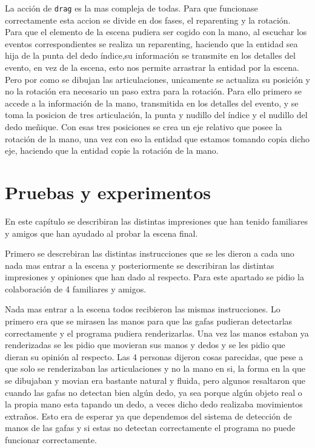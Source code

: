 \documentclass[a4paper, 12pt]{book}
\begin{document}
La acción de \texttt{drag} es la mas compleja de todas. Para que funcionase correctamente esta accion se divide en dos fases, el reparenting y la rotación. Para que el elemento de la escena pudiera ser cogido con la mano, al escuchar los eventos correspondientes se realiza un reparenting, haciendo que la entidad sea hija de la punta del dedo índice,su información se transmite en los detalles del evento, en vez de la escena, esto nos permite arrastrar la entidad por la escena. Pero por como se dibujan las articulaciones, unicamente se actualiza su posición y no la rotación era necesario un paso extra para la rotación.
Para ello primero se accede a la información de la mano, transmitida en los detalles del evento, y se toma la posicion de tres articulación, la punta y nudillo del índice y el nudillo del dedo meñique. Con esas tres posiciones se crea un eje relativo que posee la rotación de la mano, una vez con eso la entidad que estamos tomando copia dicho eje, haciendo que la entidad copie la rotación de la mano.

\cleardoublepage
\chapter{Pruebas y experimentos}
\label{chap:pruebas-experimentos}
En este capítulo se describiran las distintas impresiones que han tenido familiares y amigos que han ayudado al probar la escena final. 

Primero se descrebiran las distintas instrucciones que se les dieron a cada uno nada mas entrar a la escena y posteriormente se describiran las distintas impresiones y opiniones que han dado al respecto.
Para este apartado se pidio la colaboración de 4 familiares y amigos.

Nada mas entrar a la escena todos recibieron las mismas instrucciones. Lo primero era que se mirasen las manos para que las gafas pudieran detectarlas correctamente y el programa pudiera renderizarlas. Una vez las manos estaban ya renderizadas se les pidio que movieran sus manos y dedos y se les pidio que dieran su opinión al respecto. 
Las 4 personas dijeron cosas parecidas, que pese a que solo se renderizaban las articulaciones y no la mano en si, la forma en la que se dibujaban y movian era bastante natural y fluida, pero algunos resaltaron que cuando las gafas no detectan bien algún dedo, ya sea porque algún objeto real o la propia mano esta tapando un dedo, a veces dicho dedo realizaba movimientos extraños. 
Esto era de esperar ya que dependemos del sistema de detección de manos de las gafas y si estas no detectan correctamente el programa no puede funcionar correctamente. 
\end{document}
